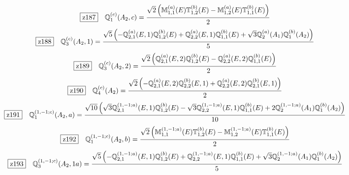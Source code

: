 \documentclass[fleqn,10pt,landscape]{jsarticle}
\begin{document}
\begin{dmath*}
\hspace*{3mm}\fbox{z187}\quad \mathbb{Q}_{1}^{(c)}(A_{2},c)=\frac{\sqrt{2} \left(\mathbb{M}_{1,1}^{(a)}(E) \mathbb{T}_{1,2}^{(b)}(E) - \mathbb{M}_{1,2}^{(a)}(E) \mathbb{T}_{1,1}^{(b)}(E)\right)}{2}
\end{dmath*}
\begin{dmath*}
\hspace*{3mm}\fbox{z188}\quad \mathbb{Q}_{3}^{(c)}(A_{2},1)=\frac{\sqrt{5} \left(- \mathbb{Q}_{2,1}^{(a)}(E,1) \mathbb{Q}_{1,2}^{(b)}(E) + \mathbb{Q}_{2,2}^{(a)}(E,1) \mathbb{Q}_{1,1}^{(b)}(E) + \sqrt{3} \mathbb{Q}_{2}^{(a)}(A_{1}) \mathbb{Q}_{1}^{(b)}(A_{2})\right)}{5}
\end{dmath*}
\begin{dmath*}
\hspace*{3mm}\fbox{z189}\quad \mathbb{Q}_{3}^{(c)}(A_{2},2)=\frac{\sqrt{2} \left(\mathbb{Q}_{2,1}^{(a)}(E,2) \mathbb{Q}_{1,2}^{(b)}(E) - \mathbb{Q}_{2,2}^{(a)}(E,2) \mathbb{Q}_{1,1}^{(b)}(E)\right)}{2}
\end{dmath*}
\begin{dmath*}
\hspace*{3mm}\fbox{z190}\quad \mathbb{Q}_{4}^{(c)}(A_{2})=\frac{\sqrt{2} \left(- \mathbb{Q}_{2,1}^{(a)}(E,2) \mathbb{Q}_{2,2}^{(b)}(E,1) + \mathbb{Q}_{2,2}^{(a)}(E,2) \mathbb{Q}_{2,1}^{(b)}(E,1)\right)}{2}
\end{dmath*}
\begin{dmath*}
\hspace*{3mm}\fbox{z191}\quad \mathbb{Q}_{1}^{(1,-1;c)}(A_{2},a)=\frac{\sqrt{10} \left(\sqrt{3} \mathbb{Q}_{2,1}^{(1,-1;a)}(E,1) \mathbb{Q}_{1,2}^{(b)}(E) - \sqrt{3} \mathbb{Q}_{2,2}^{(1,-1;a)}(E,1) \mathbb{Q}_{1,1}^{(b)}(E) + 2 \mathbb{Q}_{2}^{(1,-1;a)}(A_{1}) \mathbb{Q}_{1}^{(b)}(A_{2})\right)}{10}
\end{dmath*}
\begin{dmath*}
\hspace*{3mm}\fbox{z192}\quad \mathbb{Q}_{1}^{(1,-1;c)}(A_{2},b)=\frac{\sqrt{2} \left(\mathbb{M}_{1,1}^{(1,-1;a)}(E) \mathbb{T}_{1,2}^{(b)}(E) - \mathbb{M}_{1,2}^{(1,-1;a)}(E) \mathbb{T}_{1,1}^{(b)}(E)\right)}{2}
\end{dmath*}
\begin{dmath*}
\hspace*{3mm}\fbox{z193}\quad \mathbb{Q}_{3}^{(1,-1;c)}(A_{2},1a)=\frac{\sqrt{5} \left(- \mathbb{Q}_{2,1}^{(1,-1;a)}(E,1) \mathbb{Q}_{1,2}^{(b)}(E) + \mathbb{Q}_{2,2}^{(1,-1;a)}(E,1) \mathbb{Q}_{1,1}^{(b)}(E) + \sqrt{3} \mathbb{Q}_{2}^{(1,-1;a)}(A_{1}) \mathbb{Q}_{1}^{(b)}(A_{2})\right)}{5}
\end{dmath*}
\end{document}

